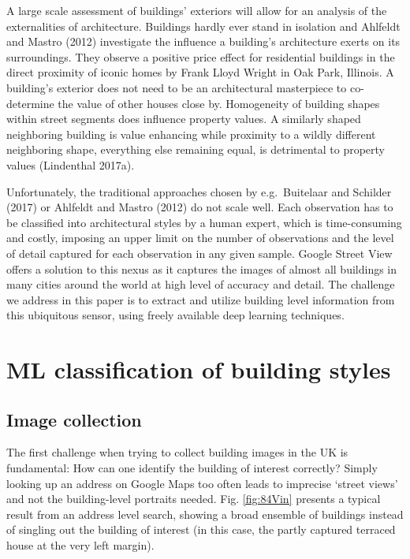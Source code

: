 \documentclass[]{article}
\begin{document}
A large scale assessment of buildings' exteriors will allow for an
analysis of the externalities of architecture. Buildings hardly ever
stand in isolation and Ahlfeldt and Mastro (2012) investigate the
influence a building's architecture exerts on its surroundings. They
observe a positive price effect for residential buildings in the direct
proximity of iconic homes by Frank Lloyd Wright in Oak Park, Illinois. A
building's exterior does not need to be an architectural masterpiece to
co-determine the value of other houses close by. Homogeneity of building
shapes within street segments does influence property values. A
similarly shaped neighboring building is value enhancing while proximity
to a wildly different neighboring shape, everything else remaining
equal, is detrimental to property values (Lindenthal 2017a).

Unfortunately, the traditional approaches chosen by e.g.~Buitelaar and
Schilder (2017) or Ahlfeldt and Mastro (2012) do not scale well. Each
observation has to be classified into architectural styles by a human
expert, which is time-consuming and costly, imposing an upper limit on
the number of observations and the level of detail captured for each
observation in any given sample. Google Street View offers a solution to
this nexus as it captures the images of almost all buildings in many
cities around the world at high level of accuracy and detail. The
challenge we address in this paper is to extract and utilize building
level information from this ubiquitous sensor, using freely available
deep learning techniques.

\hypertarget{ml-classification-of-building-styles}{%
\section{ML classification of building
styles}\label{ml-classification-of-building-styles}}

\hypertarget{image-collection}{%
\subsection{Image collection}\label{image-collection}}

The first challenge when trying to collect building images in the UK is
fundamental: How can one identify the building of interest correctly?
Simply looking up an address on Google Maps too often leads to imprecise
`street views' and not the building-level portraits needed. Fig.
\ref{fig:84Vin} presents a typical result from an address level search,
showing a broad ensemble of buildings instead of singling out the
building of interest (in this case, the partly captured terraced house
at the very left margin).
\end{document}
